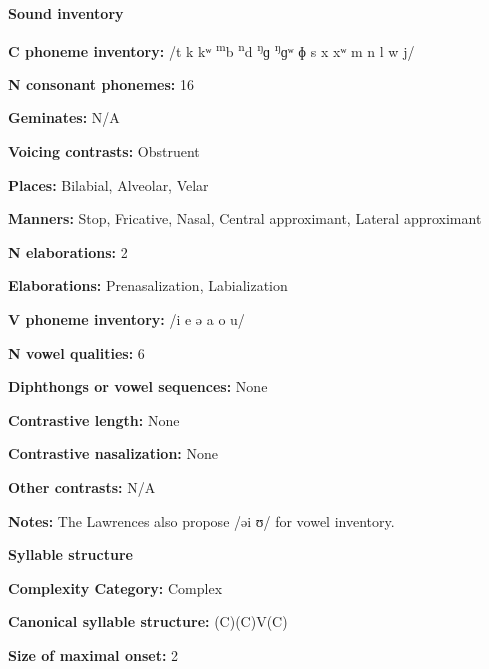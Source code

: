 \textbf{Sound inventory}



\textbf{C phoneme inventory:} /t k kʷ \textsuperscript{m}b \textsuperscript{n}d \textsuperscript{ŋ}ɡ \textsuperscript{ŋ}ɡʷ ɸ s x xʷ m n l w j/



\textbf{N consonant phonemes:} 16



\textbf{Geminates:} N/A



\textbf{Voicing contrasts:} Obstruent



\textbf{Places:} Bilabial, Alveolar, Velar



\textbf{Manners:} Stop, Fricative, Nasal, Central approximant, Lateral approximant



\textbf{N elaborations:} 2



\textbf{Elaborations:} Prenasalization, Labialization



\textbf{V phoneme inventory:} /i e ə a o u/



\textbf{N vowel qualities:} 6



\textbf{Diphthongs or vowel sequences:} None



\textbf{Contrastive length:} None



\textbf{Contrastive nasalization:} None



\textbf{Other contrasts:} N/A



\textbf{Notes:} The Lawrences also propose /əi ʊ/ for vowel inventory.



\textbf{Syllable structure}



\textbf{Complexity Category:} Complex



\textbf{Canonical syllable structure:} (C)(C)V(C) \citep[63-73]{Loughnane2009}



\textbf{Size of maximal onset:} 2



